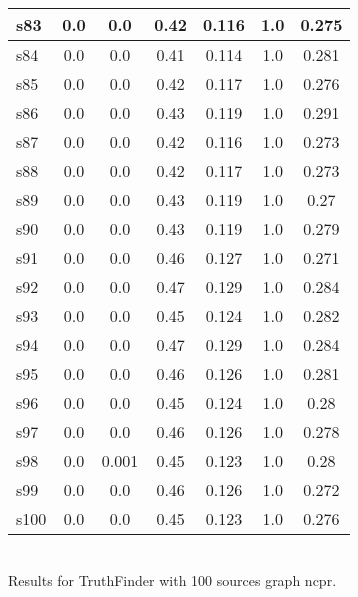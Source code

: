 \documentclass{article}
\begin{document}
\begin{tabular}{|l|c|c|c|c|c|c|}
s83 &0.0 & 0.0 & 0.42 & 0.116 & 1.0 & 0.275\\
\hline
s84 &0.0 & 0.0 & 0.41 & 0.114 & 1.0 & 0.281\\
\hline
s85 &0.0 & 0.0 & 0.42 & 0.117 & 1.0 & 0.276\\
\hline
s86 &0.0 & 0.0 & 0.43 & 0.119 & 1.0 & 0.291\\
\hline
s87 &0.0 & 0.0 & 0.42 & 0.116 & 1.0 & 0.273\\
\hline
s88 &0.0 & 0.0 & 0.42 & 0.117 & 1.0 & 0.273\\
\hline
s89 &0.0 & 0.0 & 0.43 & 0.119 & 1.0 & 0.27\\
\hline
s90 &0.0 & 0.0 & 0.43 & 0.119 & 1.0 & 0.279\\
\hline
s91 &0.0 & 0.0 & 0.46 & 0.127 & 1.0 & 0.271\\
\hline
s92 &0.0 & 0.0 & 0.47 & 0.129 & 1.0 & 0.284\\
\hline
s93 &0.0 & 0.0 & 0.45 & 0.124 & 1.0 & 0.282\\
\hline
s94 &0.0 & 0.0 & 0.47 & 0.129 & 1.0 & 0.284\\
\hline
s95 &0.0 & 0.0 & 0.46 & 0.126 & 1.0 & 0.281\\
\hline
s96 &0.0 & 0.0 & 0.45 & 0.124 & 1.0 & 0.28\\
\hline
s97 &0.0 & 0.0 & 0.46 & 0.126 & 1.0 & 0.278\\
\hline
s98 &0.0 & 0.001 & 0.45 & 0.123 & 1.0 & 0.28\\
\hline
s99 &0.0 & 0.0 & 0.46 & 0.126 & 1.0 & 0.272\\
\hline
s100 &0.0 & 0.0 & 0.45 & 0.123 & 1.0 & 0.276\\
\hline
\end{tabular}\\

\noindent Results for TruthFinder with 100 sources graph ncpr.
\end{document}
